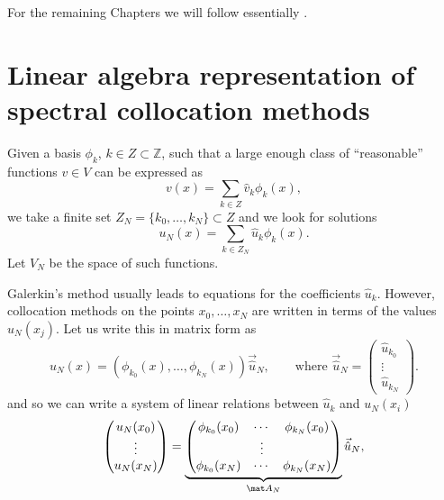 \bigskip

For the remaining Chapters we will follow essentially \cite{CanutoHussainiQuarteroniZang2011}.

\section{Linear algebra representation of spectral collocation methods}
\label{sec:spectral collocation linear algebra}

Given a basis $\phi_k$, $k \in Z \subset \mathbb Z$, such that a large enough class of ``reasonable'' functions $v \in V$ can be expressed as
\begin{equation*}
    v(x) = \sum_{k \in Z} \hat v_k \phi_k(x),
\end{equation*}
we take a finite set $Z_N = \{k_0, \dots, k_N\} \subset Z$ and we look for solutions
\begin{equation*}
    u_N(x) = \sum_{k \in Z_N} \hat u_k \phi_k(x).
\end{equation*}
Let $V_N$ be the space of such functions.

\bigskip

Galerkin's method usually leads to equations for the coefficients $\hat u_k$. However, collocation methods on the points $x_0, \dots, x_N$ are written in terms of the values $u_N(x_j)$.
Let us write this in matrix form as
\begin{equation*}
    u_N(x)
    = (\phi_{k_0} (x), \dots, \phi_{k_N}(x))
    \vec {\hat u}_N,
    \qquad \text{where }\vec{\hat u}_N
    =
    \begin{pmatrix}
        \hat u_{k_0} \\ \vdots \\ \hat u_{k_N}
    \end{pmatrix}.
\end{equation*}
and so we can write a system of linear relations between $\hat u_{k}$ and $u_N (x_i)$
\begin{equation*}
    \begin{pmatrix}
        u_N(x_0) \\ \vdots \\ u_N(x_N)
    \end{pmatrix}
    =
    \underbrace{
        \begin{pmatrix}
            \phi_{k_0} (x_0) & \cdots & \phi_{k_N}(x_0) \\
                             & \vdots                   \\
            \phi_{k_0} (x_N) & \cdots & \phi_{k_N}(x_N) \\
        \end{pmatrix}
    }_{\mat A_N}
    \vec{\hat u}_N,
\end{equation*}


